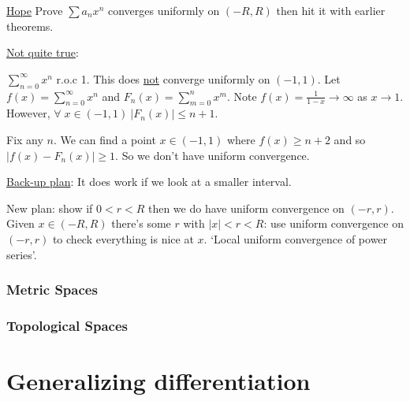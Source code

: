    \underline{Hope} Prove $\sum a_n x^n$ converges uniformly on $(-R, R)$ then hit it with earlier theorems.

    \underline{Not quite true}:
    \begin{example}
        $\sum_{n=0}^{\infty} x^n$ r.o.c 1.
        This does \underline{not} converge uniformly on $(-1, 1)$.
        Let $f(x) = \sum_{n=0}^{\infty} x^n$ and $F_n(x) = \sum_{m=0}^{n} x^m$.
        Note $f(x) = \frac{1}{1 - x} \to \infty$ as $x \to 1$.
        However, $\forall \; x \in (-1, 1) \ |F_n(x)| \leq n + 1$.

        Fix any $n$.
        We can find a point $x \in (-1, 1)$ where $f(x) \geq n + 2$ and so $|f(x) - F_n(x)| \geq 1$.
        So we don't have uniform convergence. 
    \end{example} 

    \underline{Back-up plan}: It does work if we look at a smaller interval.
    
    New plan: show if $0 < r < R$ then we do have uniform convergence on $(-r, r)$. \\
    Given $x \in (-R, R)$ there's some $r$ with $|x| < r < R$: use uniform convergence on $(-r, r)$ to check everything is nice at $x$.
    `Local uniform convergence of power series'.

    \section{Metric Spaces}
    \section{Topological Spaces}
    \part{Generalizing differentiation}

